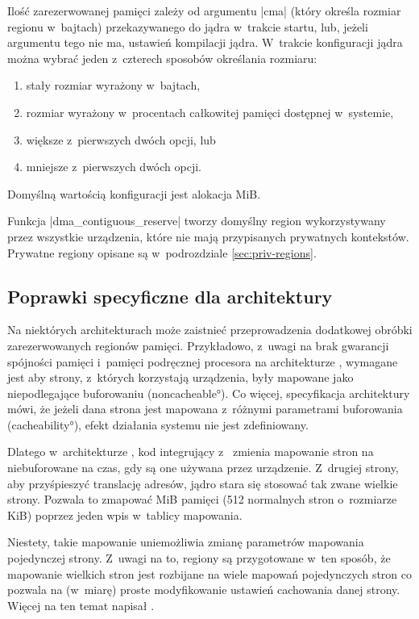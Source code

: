 Ilość zarezerwowanej pamięci zależy od argumentu \code|cma| (który
określa rozmiar regionu w~bajtach) przekazywanego do jądra w~trakcie
startu, lub, jeżeli argumentu tego nie ma, ustawień kompilacji jądra.
W~trakcie konfiguracji jądra można wybrać jeden z~czterech sposobów
określania rozmiaru:

\begin{enumerate}
\item stały rozmiar wyrażony w~bajtach,
\item rozmiar wyrażony w~procentach całkowitej pamięci dostępnej
  w~systemie,
\item większe z~pierwszych dwóch opcji, lub
\item mniejsze z~pierwszych dwóch opcji.
\end{enumerate}

Domyślną wartością konfiguracji jest alokacja \unit[16]{MiB}.

Funkcja \code|dma_contiguous_reserve| tworzy domyślny region 
wykorzystywany przez wszystkie urządzenia, które nie mają przypisanych
prywatnych kontekstów.  Prywatne regiony opisane są w~podrozdziale
\ref{sec:priv-regions}.


\subsection{Poprawki specyficzne dla architektury}

Na niektórych architekturach może zaistnieć przeprowadzenia dodatkowej
obróbki zarezerwowanych regionów pamięci.  Przykładowo, z~uwagi na
brak gwarancji spójności pamięci  i~pamięci podręcznej procesora na
architekturze  \autocite[podrozdział B5.5]{bib:arm-arch-reference},
wymagane jest aby strony, z~których korzystają urządzenia, były
mapowane jako niepodlegające buforowaniu (\ang{noncacheable}).  Co
więcej, specyfikacja architektury mówi, że jeżeli dana strona jest
mapowana z~różnymi parametrami buforowania (\ang{cacheability}), efekt
działania systemu nie jest zdefiniowany.

Dlatego w~architekturze , kod integrujący 
z~  zmienia mapowanie stron na niebuforowane na
czas, gdy są one używana przez urządzenie.  Z~drugiej strony, aby
przyśpieszyć translację adresów, jądro stara się stosować tak zwane
wielkie strony.  Pozwala to zmapować \unit[2]{MiB} pamięci (512
normalnych stron o~rozmiarze \unit[4]{KiB}) poprzez jeden wpis
w~tablicy mapowania.

Niestety, takie mapowanie uniemożliwia zmianę parametrów mapowania
pojedynczej strony.  Z~uwagi na to, regiony  są przygotowane w~ten
sposób, że mapowanie wielkich stron jest rozbijane na wiele mapowań
pojedynczych stron co pozwala na (w~miarę) proste modyfikowanie
ustawień cachowania danej strony.  Więcej na ten temat napisał
\textcite{bib:cma-and-arm}.

